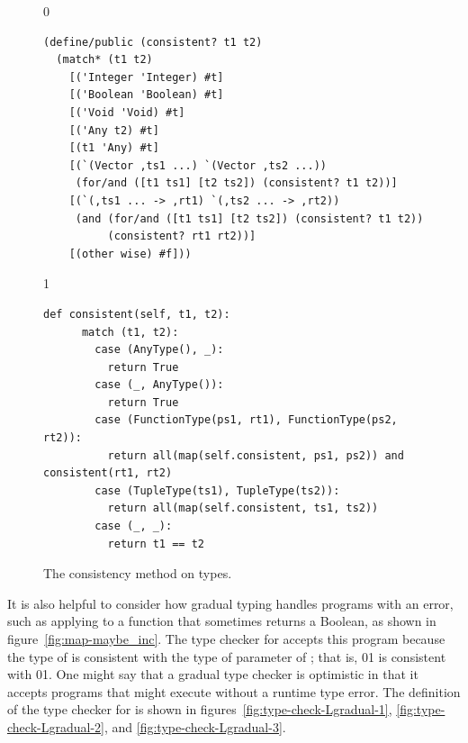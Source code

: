 \documentclass[7x10]{TimesAPriori_MIT}%
\newcommand{\gray}[1]{{\color{gray} #1}}
\def\racketEd{0}
\def\pythonEd{1}
\def\edition{1}
\newcommand{\racket}[1]{{\if\edition\racketEd{#1}\fi}}
\newcommand{\pythonColor}[0]{}
\newcommand{\python}[1]{{\if\edition\pythonEd\pythonColor #1\fi}}
\numberwithin{theorem}{chapter}
\numberwithin{definition}{chapter}
\numberwithin{equation}{chapter}
\begin{document}
\begin{figure}[tbp]
  \begin{tcolorbox}[colback=white]
{\if\edition\racketEd    
\begin{lstlisting}
(define/public (consistent? t1 t2)
  (match* (t1 t2)
    [('Integer 'Integer) #t]
    [('Boolean 'Boolean) #t]
    [('Void 'Void) #t]
    [('Any t2) #t]
    [(t1 'Any) #t]
    [(`(Vector ,ts1 ...) `(Vector ,ts2 ...))
     (for/and ([t1 ts1] [t2 ts2]) (consistent? t1 t2))]
    [(`(,ts1 ... -> ,rt1) `(,ts2 ... -> ,rt2))
     (and (for/and ([t1 ts1] [t2 ts2]) (consistent? t1 t2))
          (consistent? rt1 rt2))]
    [(other wise) #f]))
\end{lstlisting}
\fi}
{\if\edition\pythonEd\pythonColor
\begin{lstlisting}[basicstyle=\ttfamily\footnotesize]
  def consistent(self, t1, t2):
      match (t1, t2):
        case (AnyType(), _):
          return True
        case (_, AnyType()):
          return True
        case (FunctionType(ps1, rt1), FunctionType(ps2, rt2)):
          return all(map(self.consistent, ps1, ps2)) and consistent(rt1, rt2)
        case (TupleType(ts1), TupleType(ts2)):
          return all(map(self.consistent, ts1, ts2))
        case (_, _):
          return t1 == t2
\end{lstlisting}  
  \fi}
  \end{tcolorbox}

  \caption{The consistency method on types.}
\label{fig:consistent}
\end{figure}

It is also helpful to consider how gradual typing handles programs with an
error, such as applying  to a function that sometimes
returns a Boolean, as shown in figure~\ref{fig:map-maybe_inc}.  The
type checker for \LangGrad{} accepts this program because the type of
 is consistent with the type of parameter  of
; that is, 
\racket{}\python{}
is consistent with
\racket{}\python{}.
One might say that a gradual type checker is optimistic in that it
accepts programs that might execute without a runtime type error.
%
The definition of the type checker for \LangGrad{} is shown in
figures~\ref{fig:type-check-Lgradual-1}, \ref{fig:type-check-Lgradual-2},
and \ref{fig:type-check-Lgradual-3}.

\end{document}

